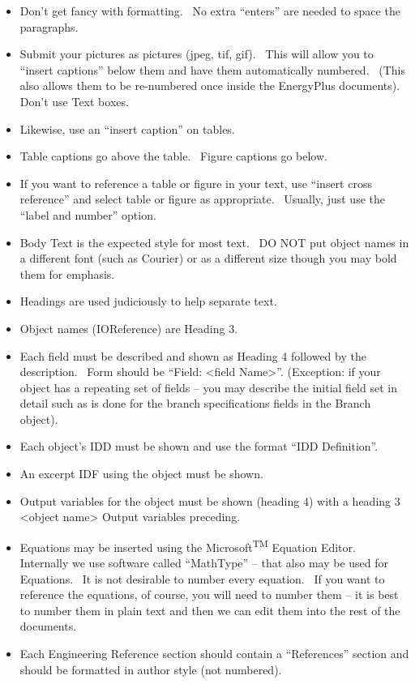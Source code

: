 \begin{itemize}
\item
  Don't get fancy with formatting.~ No extra ``enters'' are needed to space the paragraphs.
\item
  Submit your pictures as pictures (jpeg, tif, gif).~ This will allow you to ``insert captions'' below them and have them automatically numbered.~ (This also allows them to be re-numbered once inside the EnergyPlus documents).~ Don't use Text boxes.
\item
  Likewise, use an ``insert caption'' on tables.
\item
  Table captions go above the table.~ Figure captions go below.
\item
  If you want to reference a table or figure in your text, use ``insert cross reference'' and select table or figure as appropriate.~ Usually, just use the ``label and number'' option.
\item
  Body Text is the expected style for most text.~ DO NOT put object names in a different font (such as Courier) or as a different size though you may bold them for emphasis.
\item
  Headings are used judiciously to help separate text.
\item
  Object names (IOReference) are Heading 3.
\item
  Each field must be described and shown as Heading 4 followed by the description.~ Form should be ``Field: \textless{}field Name\textgreater{}''. (Exception: if your object has a repeating set of fields -- you may describe the initial field set in detail such as is done for the branch specifications fields in the Branch object).
\item
  Each object's IDD must be shown and use the format ``IDD Definition''.
\item
  An excerpt IDF using the object must be shown.
\item
  Output variables for the object must be shown (heading 4) with a heading 3 \textless{}object name\textgreater{} Output variables preceding.
\item
  Equations may be inserted using the Microsoft\textsuperscript{TM} Equation Editor.~ Internally we use software called ``MathType'' -- that also may be used for Equations.~ It is not desirable to number every equation.~ If you want to reference the equations, of course, you will need to number them -- it is best to number them in plain text and then we can edit them into the rest of the documents.
\item
  Each Engineering Reference section should contain a ``References'' section and should be formatted in author style (not numbered).
\end{itemize}

